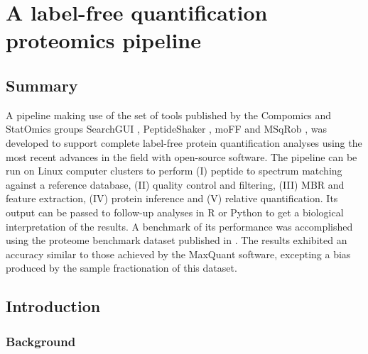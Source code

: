 \documentclass[11pt, a4paper]{report}
\begin{document}
\chapter{A label-free quantification proteomics pipeline}
\label{chap:pipeline}


\section*{Summary}

A pipeline making use of the set of tools published by the Compomics  and StatOmics groups SearchGUI \cite{Barsnes2018}, PeptideShaker \cite{Vaudel2015}, moFF \cite{Argentini2016} and MSqRob \cite{Goeminne2016} , was developed to support complete label-free protein quantification analyses using the most recent advances in the field with open-source software. The pipeline can be run on Linux computer clusters to perform (I) peptide to spectrum matching against a reference database, (II) quality control and filtering, (III) \ac{MBR} and feature extraction, (IV) protein inference and (V) relative quantification. Its output can be passed to follow-up analyses in R or Python to get a biological interpretation of the results.  A benchmark of its performance was accomplished using the proteome benchmark dataset published in \cite{Cox2014}. The results exhibited an accuracy similar to those achieved by the MaxQuant \cite{Cox2014} software, excepting a bias produced by the sample fractionation of this dataset.


\section{Introduction}

\subsection{Background}
\end{document}

